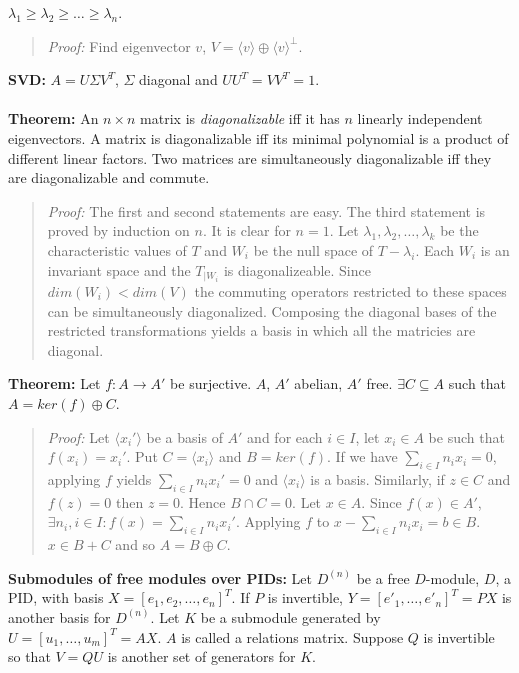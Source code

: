 $\lambda_1 \geq \lambda_2 \geq \ldots \geq \lambda_n$.
\begin{quote}
\emph{Proof:}
Find eigenvector $v$, $V= \langle v \rangle \oplus \langle v \rangle^{\perp}$.
\end{quote}
{\bf SVD:} $A= U \Sigma V^T$, $\Sigma$ diagonal and $U U^T=V V^T = 1$.
\\
\\
{\bf Theorem:}
An $n \times n$ matrix is \emph{diagonalizable} iff it has $n$ linearly independent
eigenvectors.  A matrix is diagonalizable iff its minimal polynomial is a 
product of different linear factors.
Two matrices are simultaneously diagonalizable iff
they are diagonalizable and commute.
\begin{quote}
\emph{Proof:} The first and second statements are easy.  The third statement is
proved by induction on $n$.  It is clear for $n=1$.  Let 
$ \lambda_1, \lambda_2, \ldots, \lambda_k$ be the characteristic values
of $T$ and $W_i$ be the null space of $T-\lambda_i$.  Each $W_i$ is an invariant space
and the $T_{|W_i}$ is diagonalizeable.  Since $dim(W_i)<dim(V)$ the commuting operators
restricted to these spaces can be simultaneously diagonalized.  Composing the diagonal
bases of the restricted transformations yields a basis in which all the matricies are
diagonal.
\end{quote}
{\bf Theorem:}
Let $f: A \rightarrow A'$ be surjective.  $A$, $A'$ abelian, $A'$ free.
$\exists C \subseteq A$ such that $A= ker(f) \oplus C$.
\begin{quote}
\emph{Proof:} 
Let $\langle x_i' \rangle$ be a basis of $A'$ and for each $i \in I$, let $x_i \in A$
be such that $f(x_i )= x_i'$.  Put $C= \langle x_i \rangle$ and $B=ker(f)$.  If we have
$\sum_{i \in I} n_i x_i = 0$, applying $f$ yields
$\sum_{i \in I} n_i x_i' = 0$ and $\langle x_i \rangle$ is a basis.
Similarly, if $z \in C$ and $f(z)= 0$ then $z= 0$.  Hence $B \cap C =0$.
Let $x \in A$.   Since $f(x) \in A'$, $\exists n_i, i \in I:
f(x)= \sum_{i \in I} n_i x_i'$.  Applying $f$ to $x - \sum_{i \in I} n_i x_i = b \in B$.
$x \in B + C$ and so $A= B \oplus C$.
\end{quote}
{\bf Submodules of free modules over PIDs:}  
Let $D^{(n)}$ be a free $D$-module, $D$, a PID, with basis $X= [e_1 , e_2 , \ldots , e_n]^T$.  
If $P$ is invertible, $Y= [e'_1, \ldots , e'_n]^T= P X$ is another basis for $D^{(n)}$.
Let $K$ be a submodule generated by
$U=[u_1, \ldots , u_m]^T = A X$.  $A$ is called a relations matrix.
Suppose $Q$ is invertible so that
$V= QU$ is another set of generators for $K$.

